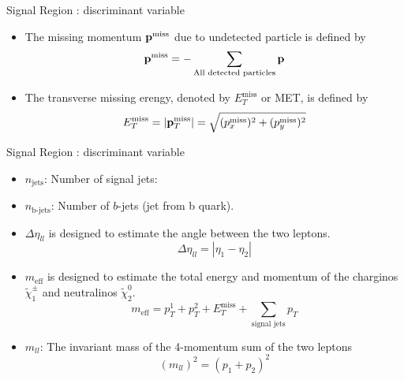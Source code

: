 \documentclass[mathserif,serif]{beamer}
\begin{document}
\begin{frame}{Signal Region : discriminant variable}
\begin{itemize}
\item The missing momentum ${\bf p}^{\text{miss}}$ due to undetected particle is defined by
\begin{equation*}
{\bf p}^{\text{miss}} = - \sum_{\text{All detected particles}}{\bf p}
\end{equation*}
\item The transverse missing erengy, denoted by $E_{T}^{\text{miss}}$ or MET, is defined by
\begin{equation*}
E_{T}^{\text{miss}} = |{\bf p}_T^{\text{miss}}| = \sqrt{ (p_x^{\text{miss}})^2 + (p_y^{\text{miss}})^2}
\end{equation*}
\end{itemize}
\end{frame}

\begin{frame}{Signal Region : discriminant variable}
\begin{itemize}
\item $n_{\text{jets}}$: Number of signal jets:
\item $n_{\text{b-jets}}$: Number of $b$-jets (jet from b quark).
\item $\Delta \eta_{ll}$ is designed to estimate the angle between the two leptons.
\begin{equation*}
\Delta \eta_{ll} = |\eta_{1} - \eta_{2}|
\end{equation*}
\item $m_{\text{eff}}$ is designed to estimate the total energy and momentum of the charginos $\tilde{\chi}_1^\pm$ and neutralinos $\tilde{\chi}_2^0$.
\begin{equation*}
m_{\text{eff}} = p_T^1 + p_T^2 + E_T^{\text{miss}} + \sum_{\text {signal jets}} p_T
\end{equation*}
\item $m_{ll}$: The invariant mass of the 4-momentum sum of the two leptons
\begin{equation*}
(m_{ll})^2 = (p_1 + p_2)^2
\end{equation*}
\end{itemize}
\end{frame}
\end{document}
